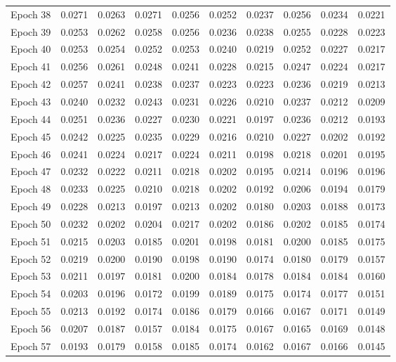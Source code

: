 \begin{table}[htbp]
\begin{tabular}{|l|l|l|l|l|l|l|l|l|l|}
Epoch 38 & 0.0271 & 0.0263 & 0.0271 & 0.0256 & 0.0252 & 0.0237 & 0.0256 & 0.0234 & 0.0221  \\
Epoch 39 & 0.0253 & 0.0262 & 0.0258 & 0.0256 & 0.0236 & 0.0238 & 0.0255 & 0.0228 & 0.0223  \\
Epoch 40 & 0.0253 & 0.0254 & 0.0252 & 0.0253 & 0.0240 & 0.0219 & 0.0252 & 0.0227 & 0.0217  \\
Epoch 41 & 0.0256 & 0.0261 & 0.0248 & 0.0241 & 0.0228 & 0.0215 & 0.0247 & 0.0224 & 0.0217  \\
Epoch 42 & 0.0257 & 0.0241 & 0.0238 & 0.0237 & 0.0223 & 0.0223 & 0.0236 & 0.0219 & 0.0213  \\
Epoch 43 & 0.0240 & 0.0232 & 0.0243 & 0.0231 & 0.0226 & 0.0210 & 0.0237 & 0.0212 & 0.0209  \\
Epoch 44 & 0.0251 & 0.0236 & 0.0227 & 0.0230 & 0.0221 & 0.0197 & 0.0236 & 0.0212 & 0.0193  \\
Epoch 45 & 0.0242 & 0.0225 & 0.0235 & 0.0229 & 0.0216 & 0.0210 & 0.0227 & 0.0202 & 0.0192  \\
Epoch 46 & 0.0241 & 0.0224 & 0.0217 & 0.0224 & 0.0211 & 0.0198 & 0.0218 & 0.0201 & 0.0195  \\
Epoch 47 & 0.0232 & 0.0222 & 0.0211 & 0.0218 & 0.0202 & 0.0195 & 0.0214 & 0.0196 & 0.0196  \\
Epoch 48 & 0.0233 & 0.0225 & 0.0210 & 0.0218 & 0.0202 & 0.0192 & 0.0206 & 0.0194 & 0.0179  \\
Epoch 49 & 0.0228 & 0.0213 & 0.0197 & 0.0213 & 0.0202 & 0.0180 & 0.0203 & 0.0188 & 0.0173  \\
Epoch 50 & 0.0232 & 0.0202 & 0.0204 & 0.0217 & 0.0202 & 0.0186 & 0.0202 & 0.0185 & 0.0174  \\
Epoch 51 & 0.0215 & 0.0203 & 0.0185 & 0.0201 & 0.0198 & 0.0181 & 0.0200 & 0.0185 & 0.0175  \\
Epoch 52 & 0.0219 & 0.0200 & 0.0190 & 0.0198 & 0.0190 & 0.0174 & 0.0180 & 0.0179 & 0.0157  \\
Epoch 53 & 0.0211 & 0.0197 & 0.0181 & 0.0200 & 0.0184 & 0.0178 & 0.0184 & 0.0184 & 0.0160  \\
Epoch 54 & 0.0203 & 0.0196 & 0.0172 & 0.0199 & 0.0189 & 0.0175 & 0.0174 & 0.0177 & 0.0151  \\
Epoch 55 & 0.0213 & 0.0192 & 0.0174 & 0.0186 & 0.0179 & 0.0166 & 0.0167 & 0.0171 & 0.0149  \\
Epoch 56 & 0.0207 & 0.0187 & 0.0157 & 0.0184 & 0.0175 & 0.0167 & 0.0165 & 0.0169 & 0.0148  \\
Epoch 57 & 0.0193 & 0.0179 & 0.0158 & 0.0185 & 0.0174 & 0.0162 & 0.0167 & 0.0166 & 0.0145  \\

\end{tabular}
\end{table}
